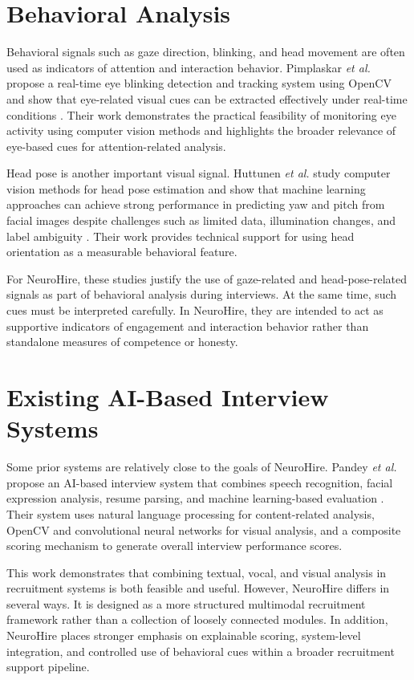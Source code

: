 \section{Behavioral Analysis}
Behavioral signals such as gaze direction, blinking, and head movement are often used as indicators of attention and interaction behavior. Pimplaskar \textit{et al.} propose a real-time eye blinking detection and tracking system using OpenCV and show that eye-related visual cues can be extracted effectively under real-time conditions \cite{pimplaskar2013eye}. Their work demonstrates the practical feasibility of monitoring eye activity using computer vision methods and highlights the broader relevance of eye-based cues for attention-related analysis.

Head pose is another important visual signal. Huttunen \textit{et al.} study computer vision methods for head pose estimation and show that machine learning approaches can achieve strong performance in predicting yaw and pitch from facial images despite challenges such as limited data, illumination changes, and label ambiguity \cite{huttunen_headpose}. Their work provides technical support for using head orientation as a measurable behavioral feature.

For NeuroHire, these studies justify the use of gaze-related and head-pose-related signals as part of behavioral analysis during interviews. At the same time, such cues must be interpreted carefully. In NeuroHire, they are intended to act as supportive indicators of engagement and interaction behavior rather than standalone measures of competence or honesty.

\section{Existing AI-Based Interview Systems}
Some prior systems are relatively close to the goals of NeuroHire. Pandey \textit{et al.} propose an AI-based interview system that combines speech recognition, facial expression analysis, resume parsing, and machine learning-based evaluation \cite{pandey2025aibased}. Their system uses natural language processing for content-related analysis, OpenCV and convolutional neural networks for visual analysis, and a composite scoring mechanism to generate overall interview performance scores.

This work demonstrates that combining textual, vocal, and visual analysis in recruitment systems is both feasible and useful. However, NeuroHire differs in several ways. It is designed as a more structured multimodal recruitment framework rather than a collection of loosely connected modules. In addition, NeuroHire places stronger emphasis on explainable scoring, system-level integration, and controlled use of behavioral cues within a broader recruitment support pipeline.

